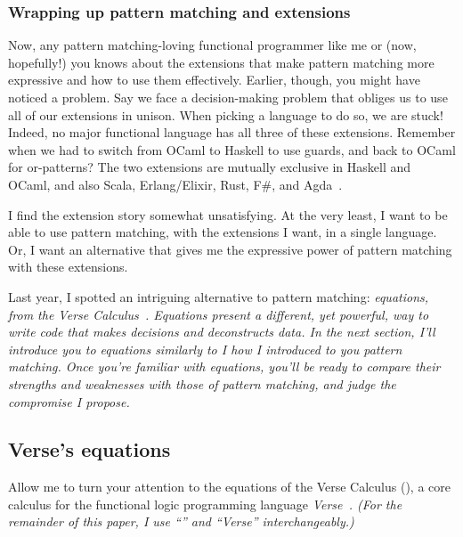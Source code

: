 \documentclass[manuscript,screen,review, 12pt, nonacm]{acmart}
\begin{document}
    \subsubsection{Wrapping up pattern matching and extensions}
    
    Now, any pattern matching-loving functional programmer like me or (now,
    hopefully!) you knows about the extensions that make pattern matching more
    expressive and how to use them effectively. Earlier, though, you might have
    noticed a problem. Say we face a decision-making problem that obliges us to
    use all of our extensions in unison. When picking a language to do so, we
    are stuck! Indeed, no major functional language has all three of these
    extensions. Remember when we had to switch from OCaml to Haskell to use
    guards, and back to OCaml for or-patterns? The two extensions are mutually
    exclusive in Haskell and OCaml, and also Scala, Erlang/Elixir, Rust, F\#,
    and Agda~\citep{haskell, ocaml, scala, erlang, elixir, rust, fsharp, agda}. 


    I find the extension story somewhat unsatisfying. At the very least, I want
    to be able to use pattern matching, with the extensions I want, in a single
    language. Or, I want an alternative that gives me the expressive power of
    pattern matching with these extensions. 

    Last year, I spotted an intriguing alternative to pattern matching:
    \it{equations}, from the Verse Calculus~\citep{verse}. Equations present a
    different, yet powerful, way to write code that makes decisions and
    deconstructs data. In the next section, I'll introduce you to equations
    similarly to I how I introduced to you pattern matching. Once you're
    familiar with equations, you'll be ready to compare their strengths and
    weaknesses with those of pattern matching, and judge the compromise I
    propose. 

\subsection{Verse's equations}
    \label{verseoverobservers}

    Allow me to turn your attention to the equations of the Verse Calculus
    (\VC), a core calculus for the functional logic programming language
    \it{Verse}~\citep{antoy2010functional, hanus2013functional, verse}. (For the
    remainder of this paper, I use “\VC” and “Verse” interchangeably.)
\end{document}
